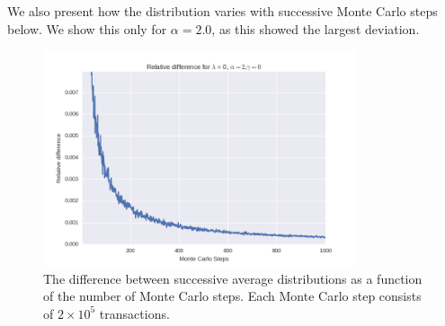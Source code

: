 \documentclass[a4paper, 10pt]{article}
\begin{document}
\linebreak
We also present how the distribution varies with successive Monte Carlo steps below. We show this only for $\alpha=2.0$, as this showed the largest deviation.
\begin{figure}[!hb]
\centering
\includegraphics[height=2.5in]{relDiffL0A2G0.png} %
\caption{The difference between successive average distributions as a function of the number of Monte Carlo steps. Each Monte Carlo step consists of $2\times 10^5$ transactions.}\label{fig:ModelC_MC_Steps}
\end{figure}
\newpage
\end{document}
